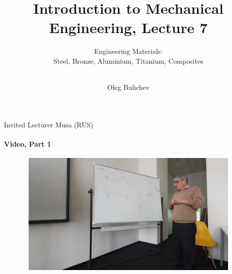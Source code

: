 \documentclass[aspectratio=169]{beamer}
\title[IME]{Introduction to Mechanical Engineering, Lecture 7} %
\subtitle{Engineering Materials:  
\\ Steel, Bronze, Aluminium, Titanium, Composites  \\   
\ } %
\author{Oleg Bulichev}
\newcommand{\fbckg}[1]{\usebackgroundtemplate{\texttt{[image: \#1]}}}%
\begin{document}
\setlength{\abovedisplayskip}{0pt}
\setlength{\belowdisplayskip}{0pt}
\setlength{\abovedisplayshortskip}{0pt}
\setlength{\belowdisplayshortskip}{0pt}

\fbckg{fibeamer/figs/title_page.png}

\fbckg{fibeamer/figs/common.png}

\note{\scriptsize \begin{itemize}
        \item \
    \end{itemize}}

    \begin{frame}[t]{Invited Lecturer Musa (RUS)}
        \framesubtitle{Video, Part 1}
        \vspace{-0.6cm}
        \begin{figure}[H]
            \href{https://disk.yandex.ru/i/pmZGYsEMQlrWTA}{
                \centering\includegraphics[height=6cm,width=1\textwidth,keepaspectratio]{musa_lec_1_video.png}}
            \label{fig:musa_lec_1_video.png}
        \end{figure}
    \end{frame}
    
\end{document}
